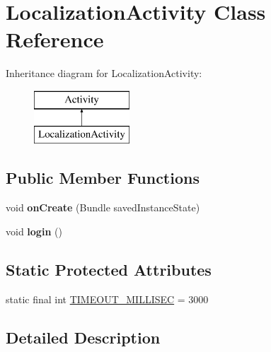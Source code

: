 \hypertarget{classapp_1_1localization_1_1_localization_activity}{\section{Localization\-Activity Class Reference}
\label{classapp_1_1localization_1_1_localization_activity}
}
Inheritance diagram for Localization\-Activity\-:\begin{figure}[H]
\begin{center}
\leavevmode
\includegraphics[height=2.000000cm]{classapp_1_1localization_1_1_localization_activity}
\end{center}
\end{figure}
\subsection*{Public Member Functions}
\begin{DoxyCompactItemize}
\item 
\hypertarget{classapp_1_1localization_1_1_localization_activity_a85e87cb5ced88dff7c8173ecc4f636d1}{void {\bfseries on\-Create} (Bundle saved\-Instance\-State)}\label{classapp_1_1localization_1_1_localization_activity_a85e87cb5ced88dff7c8173ecc4f636d1}

\item 
\hypertarget{classapp_1_1localization_1_1_localization_activity_af76b7b46958dabf5e4ee9a492f0ec3fa}{void {\bfseries login} ()}\label{classapp_1_1localization_1_1_localization_activity_af76b7b46958dabf5e4ee9a492f0ec3fa}

\end{DoxyCompactItemize}
\subsection*{Static Protected Attributes}
\begin{DoxyCompactItemize}
\item 
static final int \hyperlink{classapp_1_1localization_1_1_localization_activity_af5858805af6e7dae14f55e3f4d0e0f9e}{T\-I\-M\-E\-O\-U\-T\-\_\-\-M\-I\-L\-L\-I\-S\-E\-C} = 3000
\end{DoxyCompactItemize}


\subsection{Detailed Description}


